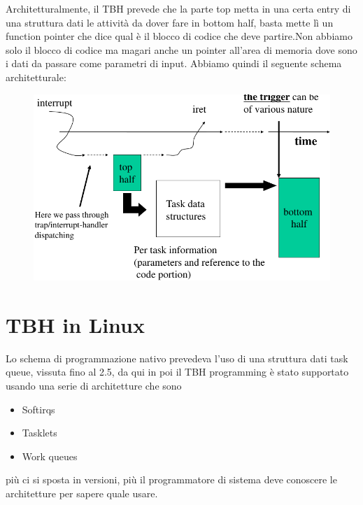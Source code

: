 \documentclass[12pt, oneside]{extbook}
\begin{document}
Architetturalmente, il TBH prevede che la parte top metta in una certa entry di una struttura dati le attività da dover fare in bottom half, basta mette lì un function pointer che dice qual è il blocco di codice che deve partire.Non abbiamo solo il blocco di codice ma magari anche un pointer all'area di memoria dove sono i dati da passare come parametri di input. Abbiamo quindi il seguente schema architetturale:
\begin{figure}[!h]
	\includegraphics[scale=0.4]{immagini/tbh_architecture.png}
	\label{tbh_arch}
\end{figure}
\section{TBH in Linux}
Lo schema di programmazione nativo prevedeva l'uso di una struttura dati task queue, vissuta fino al 2.5, da qui in poi il TBH programming è stato supportato usando una serie di architetture che sono 
\begin{itemize}
\item Softirqs
\item Tasklets
\item Work queues
\end{itemize}
più ci si sposta in versioni, più il programmatore di sistema deve conoscere le architetture per sapere quale usare.\\
\end{document}
